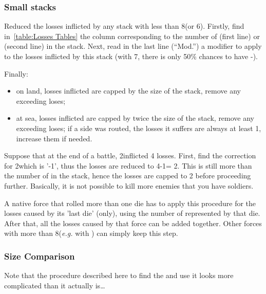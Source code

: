 \subsubsection{Small stacks}

Reduced the losses inflicted by any stack with less than 8\LD (or
6\ND). Firstly, find in~\ref{table:Losses Tables} the column corresponding to
the number of \ND (first line) or \LD (second line) in the stack. Next, read
in the last line (``Mod.'') a modifier to apply to the losses inflicted by
this stack (with 7\LD, there is only 50\% chances to have -\texttu).

Finally:
\begin{itemize}
\item on land, losses inflicted are capped by the size of the stack, remove
  any exceeding loses;
\item at sea, losses inflicted are capped by twice the size of the stack,
  remove any exceeding loses; if a side was routed, the losses it suffers are
  always at least 1\ND, increase them if needed.
\end{itemize}

\begin{exemple}
  Suppose that at the end of a battle, 2\LD inflicted 4 losses. First, find
  the correction for 2\LD which is '-1\texttu', thus the losses are reduced to
  4-1\texttu = 2\texttd. This is still more than the number of \LD in the
  stack, hence the losses are capped to 2 before proceeding
  further. Basically, it is not possible to kill more enemies that you have
  soldiers.
\end{exemple}

A native force that rolled more than one die has to apply this procedure for
the losses caused by its 'last die' (only), using the number of \LD
represented by that die. After that, all the losses caused by that force can
be added together. Other forces with more than 8\LD (\emph{e.g.} \TUR with
\Pashas) can simply keep this step.

\subsubsection{Size Comparison}
Note that the procedure described here to find the 
and use it looks more complicated than it actually is\ldots



